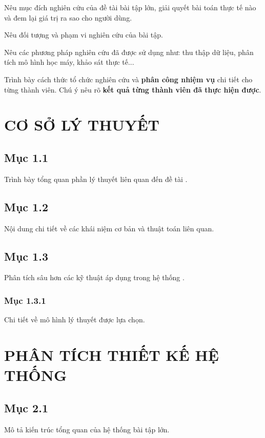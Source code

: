 \documentclass[12pt,a4paper]{report}
\begin{document}
Nêu mục đích nghiên cứu của đề tài bài tập lớn, giải quyết bài toán thực tế nào và đem lại giá trị ra sao cho người dùng.

Nêu đối tượng và phạm vi nghiên cứu của bài tập.

Nêu các phương pháp nghiên cứu đã được sử dụng như: thu thập dữ liệu, phân tích mô hình học máy, khảo sát thực tế...

Trình bày cách thức tổ chức nghiên cứu và \textbf{phân công nhiệm vụ} chi tiết cho từng thành viên. Chú ý nêu rõ \textbf{kết quả từng thành viên đã thực hiện được}.

\chapter{CƠ SỞ LÝ THUYẾT}

\section{Mục 1.1}
Trình bày tổng quan phần lý thuyết liên quan đến đề tài \cite{ref1}.

\section{Mục 1.2}
Nội dung chi tiết về các khái niệm cơ bản và thuật toán liên quan.

\section{Mục 1.3}
Phân tích sâu hơn các kỹ thuật áp dụng trong hệ thống \cite{ref2}.

\subsection{Mục 1.3.1}
Chi tiết về mô hình lý thuyết được lựa chọn.

\chapter{PHÂN TÍCH THIẾT KẾ HỆ THỐNG}

\section{Mục 2.1}
Mô tả kiến trúc tổng quan của hệ thống bài tập lớn.
\end{document}
